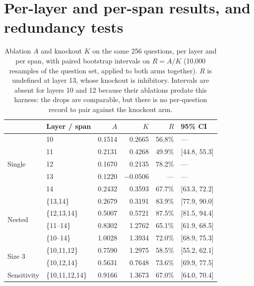 \documentclass[11pt,a4paper]{article}
\begin{document}
\section{Per-layer and per-span results, and redundancy tests}

\begin{table}[h]
  \centering
  \caption{Ablation $A$ and knockout $K$ on the same 256 questions, per layer and
  per span, with paired bootstrap intervals on $R = A/K$ (10{,}000 resamples of
  the question set, applied to both arms together). $R$ is undefined at layer 13,
  whose knockout is inhibitory. Intervals are absent for layers 10 and 12 because
  their ablations predate this harness: the drops are comparable, but there is no
  per-question record to pair against the knockout arm.}
  \label{tab:spans}
  \begin{tabular}{llrrrl}
    \toprule
    & Layer / span & $A$ & $K$ & $R$ & 95\% CI \\
    \midrule
    \multirow{5}{*}{Single}
      & 10 & 0.1514 & 0.2665 & 56.8\% & --- \\
      & 11 & 0.2131 & 0.4268 & 49.9\% & [44.8, 55.3] \\
      & 12 & 0.1670 & 0.2135 & 78.2\% & --- \\
      & 13 & 0.1220 & $-0.0506$ & --- & --- \\
      & 14 & 0.2432 & 0.3593 & 67.7\% & [63.3, 72.2] \\
    \midrule
    \multirow{4}{*}{Nested}
      & \{13,14\}     & 0.2679 & 0.3191 & 83.9\% & [77.9, 90.0] \\
      & \{12,13,14\}  & 0.5007 & 0.5721 & 87.5\% & [81.5, 94.4] \\
      & \{11--14\}    & 0.8302 & 1.2762 & 65.1\% & [61.9, 68.5] \\
      & \{10--14\}    & 1.0028 & 1.3934 & 72.0\% & [68.9, 75.3] \\
    \midrule
    \multirow{2}{*}{Size 3}
      & \{10,11,12\}  & 0.7590 & 1.2975 & 58.5\% & [55.2, 62.1] \\
      & \{10,12,14\}  & 0.5631 & 0.7648 & 73.6\% & [69.9, 77.5] \\
    \midrule
    Sensitivity & \{10,11,12,14\} & 0.9166 & 1.3673 & 67.0\% & [64.0, 70.4] \\
    \bottomrule
  \end{tabular}
\end{table}
\end{document}
